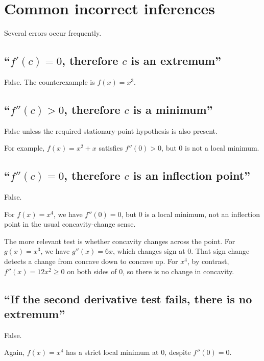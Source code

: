 \documentclass{essay}
\begin{document}
\section{Common incorrect inferences}

Several errors occur frequently.

\subsection{\texorpdfstring{``\(f'(c)=0\), therefore \(c\) is an extremum''}{``f'(c)=0, therefore c is an extremum''}}

False. The counterexample is \(f(x)=x^{3}\).

\subsection{\texorpdfstring{``\(f''(c)>0\), therefore \(c\) is a minimum''}{``f''(c)>0, therefore c is a minimum''}}

False unless the required stationary-point hypothesis is also present.

For example, \(f(x)=x^{2}+x\) satisfies \(f''(0)>0\), but \(0\) is not a local minimum.

\subsection{\texorpdfstring{``\(f''(c)=0\), therefore \(c\) is an inflection point''}{``f''(c)=0, therefore c is an inflection point''}}

False.

For \(f(x)=x^{4}\), we have \(f''(0)=0\), but \(0\) is a local minimum, not an inflection point in the usual concavity-change sense.

The more relevant test is whether concavity changes across the point. For \(g(x)=x^{3}\), we have \(g''(x)=6x\), which changes sign at \(0\). That sign change detects a change from concave down to concave up. For \(x^{4}\), by contrast, \(f''(x)=12x^{2}\geq0\) on both sides of \(0\), so there is no change in concavity.

\subsection{``If the second derivative test fails, there is no extremum''}

False.

Again, \(f(x)=x^{4}\) has a strict local minimum at \(0\), despite \(f''(0)=0\).
\end{document}
